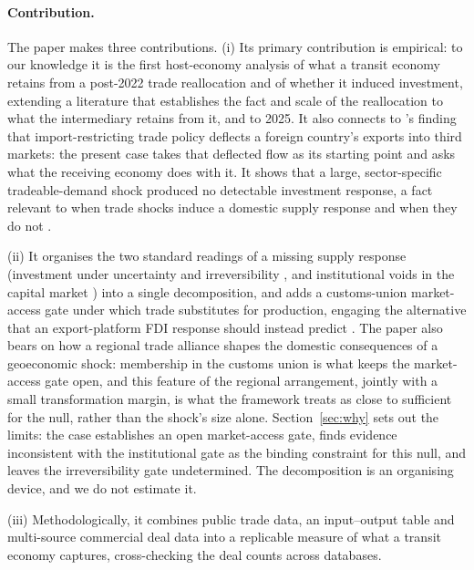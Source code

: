 \documentclass[12pt]{article}
\begin{document}
\paragraph{Contribution.} The paper makes three contributions. (i) Its primary contribution is
empirical: to our knowledge it is the first host-economy analysis of what a transit economy
retains from a post-2022 trade reallocation and of whether it induced investment, extending a
literature that establishes the fact and scale of the reallocation to what the intermediary
retains from it, and to 2025. It also connects to \citet{bowncrowley2007}'s finding that
import-restricting trade policy deflects a foreign country's exports into third markets: the
present case takes that deflected flow as its starting point and asks what the receiving
economy does with it. It shows that a large,
sector-specific tradeable-demand shock produced no detectable investment response, a fact
relevant to when trade shocks induce a domestic supply response and when they do not
\citep{juhasz2018temporary,bloom2016trade,juhaszlanerodrik2024,gopinathneiman2014}.

(ii) It organises the two standard readings of a missing supply response (investment under
uncertainty and irreversibility \citep{dixitpindyck1994,handleylimao2015,handleylimao2017}, and
institutional voids in the
capital market \citep{khanna1997,khannapalepu2000,rajanzingales1998}) into a single
decomposition, and adds a customs-union market-access gate under which trade substitutes for
production, engaging the alternative that an export-platform FDI response should instead
predict \citep{brainard1997,helpmanmelitzyeaple2004,ekholmforslidmarkusen2007}. The paper also bears
on how a regional trade alliance shapes the domestic consequences of a geoeconomic shock:
membership in the customs union is what keeps the market-access gate open, and this feature
of the regional arrangement, jointly with a small transformation margin, is what the framework
treats as close to sufficient for the null, rather than the shock's size alone.
Section~\ref{sec:why} sets out the limits: the case establishes an open market-access gate,
finds evidence inconsistent with the institutional gate as the binding constraint for this
null, and leaves the irreversibility gate undetermined. The decomposition is an organising
device, and we do not estimate it.

(iii) Methodologically,
it combines public trade data, an input--output table and multi-source commercial deal data
into a replicable measure of what a transit economy captures, cross-checking the deal counts
across databases.
\end{document}
